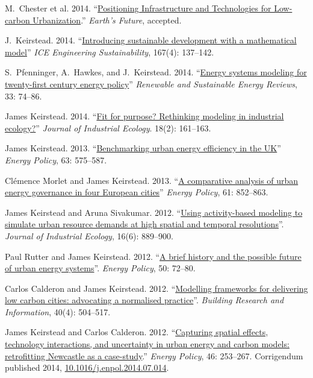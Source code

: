 \documentclass[11pt,a4paper]{article}
\begin{document}
\ind M.\ Chester et al. 2014. ``\href{http://onlinelibrary.wiley.com/enhanced/doi/10.1002/2014EF000253/}{Positioning Infrastructure and Technologies for Low-carbon Urbanization}.'' \emph{Earth's Future}, accepted.

\ind J.\ Keirstead.  2014.  ``\href{http://dx.doi.org/10.1680/ensu.13.00036}{Introducing sustainable development with a mathematical model}'' \emph{ICE Engineering Sustainability}, 167(4): 137--142.

\ind S.\ Pfenninger, A.\ Hawkes, and J.\ Keirstead. 2014. ``\href{http://dx.doi.org/10.1016/j.rser.2014.02.003}{Energy systems modeling for twenty-first century energy policy}'' \emph{Renewable and Sustainable Energy Reviews}, 33: 74--86.

\ind James Keirstead. 2014. ``\href{http://dx.doi.org/10.1111/jiec.12093}{Fit for purpose? Rethinking modeling in industrial ecology?}'' \emph{Journal of Industrial Ecology}. 18(2): 161--163.

\ind James Keirstead. 2013. ``\href{http://dx.doi.org/10.1016/j.enpol.2013.08.063}{Benchmarking urban energy efficiency in the UK}'' \emph{Energy Policy}, 63: 575--587.

\ind Clémence Morlet and James Keirstead. 2013. ``\href{http://dx.doi.org/10.1016/j.enpol.2013.06.085}{A comparative analysis of urban energy governance in four European cities}'' \emph{Energy Policy}, 61: 852--863.

\ind James Keirstead and Aruna Sivakumar. 2012. ``\href{http://dx.doi.org/10.1111/j.1530-9290.2012.00486.x}{Using activity-based modeling to simulate urban resource demands at high spatial and temporal resolutions}''. \emph{Journal of Industrial Ecology}, 16(6): 889--900.

\ind Paul Rutter and James Keirstead.  2012. ``\href{http://dx.doi.org/10.1016/j.enpol.2012.03.072}{A brief history and the possible future of urban energy systems}''. \emph{Energy Policy}, 50: 72--80.

\ind Carlos Calderon and James Keirstead. 2012. ``\href{http://dx.doi.org/10.1080/09613218.2012.680702}{Modelling frameworks for delivering low carbon cities: advocating a normalised practice}''. \emph{Building Research and Information}, 40(4): 504--517.

\ind James Keirstead and Carlos Calderon.  2012. ``\href{http://dx.doi.org/10.1016/j.enpol.2012.03.058}{Capturing spatial effects, technology interactions, and uncertainty in urban energy and carbon models: retrofitting Newcastle as a case-study}.''  \emph{Energy Policy}, 46: 253--267.  Corrigendum published 2014, \href{http://dx.doi.org/10.1016/j.enpol.2014.07.014}{10.1016/j.enpol.2014.07.014}.
\end{document}
